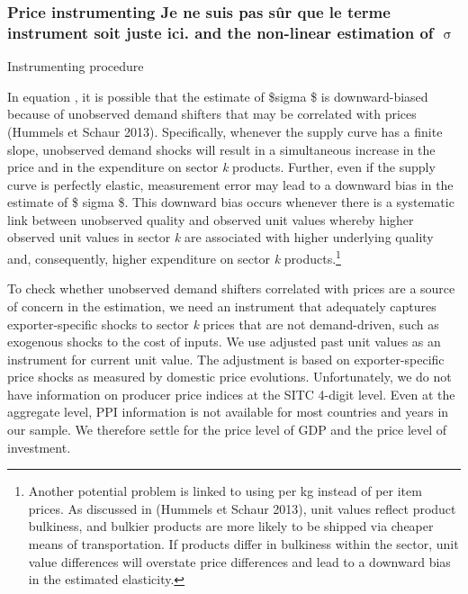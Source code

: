 \documentclass[12pt,twoside,a4paper,notitlepage]{article}
\begin{document}
{\subsubsection{Price instrumenting%
Je ne suis pas s\^{u}r que le terme {\flqq}instrument{\frqq} soit juste ici.
 and the non-linear estimation of ${\upsigma}$\label{mark-2.3.2.}}

Instrumenting procedure

In equation {\hyperref[ref-002]{ }}, it is possible that the estimate of \$sigma \$ is downward-biased because of unobserved demand shifters that may be correlated with prices (Hummels et Schaur 2013).
Specifically, whenever the supply curve has a finite slope, unobserved demand shocks will result in a simultaneous increase in the price and in the expenditure on sector \textit{k} products.
Further, even if the supply curve is perfectly elastic, measurement error may lead to a downward bias in the estimate of \$ sigma \$.
This downward bias occurs whenever there is a systematic link between unobserved quality and observed unit values whereby higher observed unit values in sector \textit{k} are associated with higher underlying quality and, consequently, higher expenditure on sector \textit{k} products.\footnote{Another potential problem is linked to using per kg instead of per item prices.
As discussed in (Hummels et Schaur 2013), unit values reflect product bulkiness, and bulkier products are more likely to be shipped via cheaper means of transportation.
If products differ in bulkiness within the sector, unit value differences will overstate price differences and lead to a downward bias in the estimated elasticity.
} 

To check whether unobserved demand shifters correlated with prices are a source of concern in the estimation, we need an instrument that adequately captures exporter-specific shocks to sector \textit{k} prices that are not demand-driven, such as exogenous shocks to the cost of inputs.
We use adjusted past unit values as an instrument for current unit value.
The adjustment is based on exporter-specific price shocks as measured by domestic price evolutions.
Unfortunately, we do not have information on producer price indices at the SITC 4-digit level.
Even at the aggregate level, PPI information is not available for most countries and years in our sample.
We therefore settle for the price level of GDP and the price level of investment.

}
\end{document}
